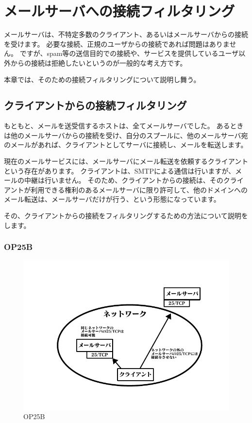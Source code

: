 \chapter{メールサーバへの接続フィルタリング}

メールサーバは、不特定多数のクライアント、あるいはメールサーバからの接続を受けます。
必要な接続、正規のユーザからの接続であれば問題はありません。
ですが、spam等の送信目的での接続や、サービスを提供しているユーザ以外からの接続は拒絶したいというのが一般的な考え方です。

本章では、そのための接続フィルタリングについて説明し舞う。

\section{クライアントからの接続フィルタリング}

もともと、メールを送受信するホストは、全てメールサーバでした。
あるときは他のメールサーバからの接続を受け、自分のスプールに、他のメールサーバ宛のメールがあれば、クライアントとしてサーバに接続し、メールを転送します。

現在のメールサービスには、メールサーバにメール転送を依頼するクライアントという存在があります。
クライアントは、SMTPによる通信は行いますが、メールの中継は行いません。
そのため、クライアントからの接続は、そのクライアントが利用できる権利のあるメールサーバに限り許可して、他のドメインへのメール転送は、メールサーバだけが行う、という形態になっています。

その、クライアントからの接続をフィルタリングするための方法について説明をします。


\subsection{OP25B}

\begin{figure}[htbp]
	\includegraphics[width=12cm,clip]{draw/op25b.pdf}
	\caption{OP25B}
	\label{fig:op25b}
\end{figure}

